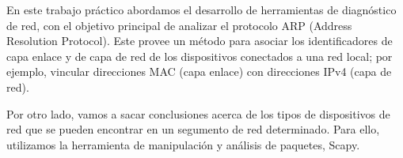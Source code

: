 En este trabajo práctico abordamos el desarrollo de herramientas de diagnóstico de red, con el objetivo principal de analizar el protocolo ARP (Address Resolution Protocol). Este provee un método para asociar los identificadores de capa enlace y de capa de red de los dispositivos conectados a una red local; por ejemplo, vincular direcciones MAC (capa enlace) con direcciones IPv4 (capa de red).

Por otro lado, vamos a sacar conclusiones acerca de los tipos de dispositivos de red que se pueden encontrar en un segumento de red determinado. Para ello, utilizamos la herramienta de manipulación y análisis de paquetes, Scapy.